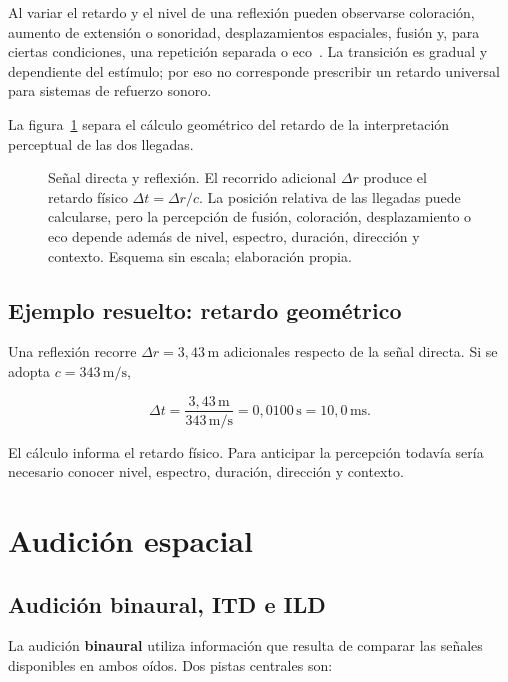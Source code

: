 Al variar el retardo y el nivel de una reflexión pueden observarse
coloración, aumento de extensión o sonoridad, desplazamientos espaciales,
fusión y, para ciertas condiciones, una repetición separada o eco~\cite{litovsky1999}. La
transición es gradual y dependiente del estímulo; por eso no corresponde
prescribir un retardo universal para sistemas de refuerzo sonoro.

La figura~\ref{fig:u7-precedencia-reflexiones} separa el cálculo geométrico del
retardo de la interpretación perceptual de las dos llegadas.

\begin{figure}[htbp]
    \centering
    
    \caption{Señal directa y reflexión. El recorrido adicional
    \(\Delta r\) produce el retardo físico
    \(\Delta t=\Delta r/c\). La posición relativa de las llegadas puede
    calcularse, pero la percepción de fusión, coloración, desplazamiento o eco
    depende además de nivel, espectro, duración, dirección y contexto. Esquema
    sin escala; elaboración propia.}
    \label{fig:u7-precedencia-reflexiones}
\end{figure}

\subsection{Ejemplo resuelto: retardo geométrico}
\label{sec:u7-ejemplo-reflexion}

Una reflexión recorre \(\Delta r=3{,}43\,\text{m}\) adicionales respecto de
la señal directa. Si se adopta \(c=343\,\text{m}/\text{s}\),

\[
    \Delta t
      =\frac{3{,}43\,\text{m}}{343\,\text{m}/\text{s}}
      =0{,}0100\,\text{s}
      =10{,}0\,\text{ms}.
\]

El cálculo informa el retardo físico. Para anticipar la percepción todavía
sería necesario conocer nivel, espectro, duración, dirección y contexto.

\section{Audición espacial}
\label{sec:u7-audicion-espacial}

\subsection{Audición binaural, ITD e ILD}
\label{sec:u7-itd-ild}

La audición \textbf{binaural} utiliza información que resulta de comparar las
señales disponibles en ambos oídos. Dos pistas centrales son:


